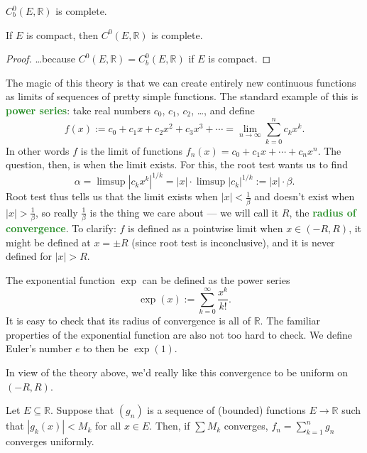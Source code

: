 \documentclass[10pt]{scrartcl}
\providecommand{\RR}{\mathbb R}
\providecommand{\vocab}[1]{{\textbf{\textcolor{ForestGreen}{#1}}}}
\begin{document}
\begin{corollary}
	$C^0_b(E,\RR)$ is complete.
\end{corollary}

\begin{corollary}
	If $E$ is compact, then $C^0(E,\RR)$ is complete.
\end{corollary}
\begin{proof}
	\dots because $C^0(E,\RR) = C^0_b(E,\RR)$ if $E$ is compact.
\end{proof}

The magic of this theory is that we can create entirely new continuous functions
as limits of sequences of pretty simple functions.
The standard example of this is \vocab{power series}:
take real numbers $c_0$, $c_1$, $c_2$, \dots, and define
\[f(x):= c_0 + c_1x + c_2x^2 + c_3x^3 + \cdots =
\lim_{n\to\infty} \sum_{k=0}^n c_kx^k.\]
In other words $f$ is the limit of functions
$f_n(x) = c_0 + c_1x + \cdots + c_nx^n$.
The question, then, is when the limit exists.
For this, the root test wants us to find
\[\alpha = \limsup |c_kx^k|^{1/k} = |x|\cdot\limsup |c_k|^{1/k}
:= |x|\cdot\beta.\]
Root test thus tells us that the limit exists when $|x| < \frac 1\beta$
and doesn't exist when $|x| > \frac1\beta$, so really
$\frac1\beta$ is the thing we care about --- we will call it
$R$, the \vocab{radius of convergence}.
To clarify: $f$ is defined as a pointwise limit when $x\in(-R, R)$,
it might be defined at $x = \pm R$ (since root test is inconclusive),
and it is never defined for $|x| > R$.

\begin{example}
	The exponential function $\exp$ can be defined as the power series
	\[\exp(x) := \sum_{k=0}^\infty \frac{x^k}{k!}.\]
	It is easy to check that its radius of convergence is all of $\RR$.
	The familiar properties of the exponential function
	are also not too hard to check.
	We define Euler's number $e$ to then be $\exp(1)$.
\end{example}

In view of the theory above, we'd really like this convergence
to be uniform on $(-R, R)$.

\begin{theorem}
	Let $E\subseteq\RR$. Suppose that $(g_n)$ is a sequence of
	(bounded) functions $E\to\RR$ such that $|g_k(x)| < M_k$ for all $x\in E$.
	Then, if $\sum M_k$ converges, $f_n = \sum_{k=1}^n g_n$ converges uniformly.
\end{theorem}
\end{document}
